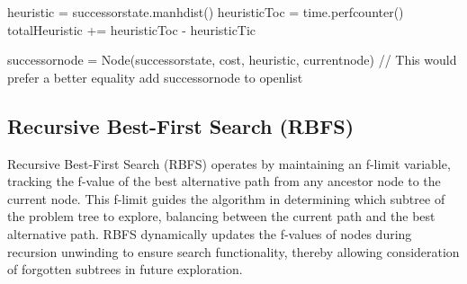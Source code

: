 \documentclass{article}
\begin{document}
\begin{algorithm}[h]
            \Else 
            \State heuristic = successorstate.manhdist()
            \EndIf
            \State heuristicToc = time.perfcounter()
            \State totalHeuristic += heuristicToc - heuristicTic
            
            \State successornode = Node(successorstate, cost, heuristic, currentnode)
              // This would prefer a better equality
            \State add successornode to openlist
            \EndIf

            \EndFor


   
   
   
  \label{alg:A*}
\end{algorithm}


\subsection{Recursive Best-First Search (RBFS)}
Recursive Best-First Search (RBFS) operates by maintaining an f-limit variable, tracking the f-value of the best alternative path from any ancestor node to the current node. This f-limit guides the algorithm in determining which subtree of the problem tree to explore, balancing between the current path and the best alternative path. RBFS dynamically updates the f-values of nodes during recursion unwinding to ensure search functionality, thereby allowing consideration of forgotten subtrees in future exploration.
\end{document}
